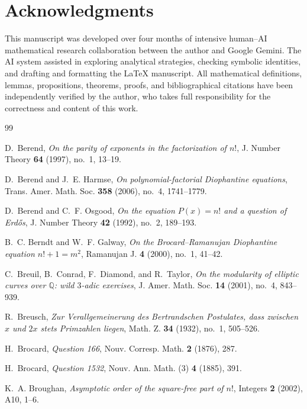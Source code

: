 \documentclass[11pt,reqno]{amsart}
\theoremstyle{remark}
\numberwithin{equation}{section}
\newcommand{\Q}{\mathbb{Q}}
\begin{document}
\section*{Acknowledgments}
This manuscript was developed over four months of intensive human--AI mathematical research collaboration between the author and Google Gemini. The AI system assisted in exploring analytical strategies, checking symbolic identities, and drafting and formatting the \LaTeX{} manuscript. All mathematical definitions, lemmas, propositions, theorems, proofs, and bibliographical citations have been independently verified by the author, who takes full responsibility for the correctness and content of this work.

\begin{thebibliography}{99}

D.~Berend, \emph{On the parity of exponents in the factorization of $n!$}, J. Number Theory \textbf{64} (1997), no.~1, 13--19.

D.~Berend and J.~E. Harmse, \emph{On polynomial-factorial Diophantine equations}, Trans. Amer. Math. Soc. \textbf{358} (2006), no.~4, 1741--1779.

D.~Berend and C.~F. Osgood, \emph{On the equation $P(x) = n!$ and a question of Erd\H{o}s}, J. Number Theory \textbf{42} (1992), no.~2, 189--193.

B.~C. Berndt and W.~F. Galway, \emph{On the Brocard--Ramanujan Diophantine equation $n! + 1 = m^2$}, Ramanujan J. \textbf{4} (2000), no.~1, 41--42.

C.~Breuil, B.~Conrad, F.~Diamond, and R.~Taylor, \emph{On the modularity of elliptic curves over $\Q$: wild $3$-adic exercises}, J. Amer. Math. Soc. \textbf{14} (2001), no.~4, 843--939.

R.~Breusch, \emph{Zur Verallgemeinerung des Bertrandschen Postulates, dass zwischen $x$ und $2x$ stets Primzahlen liegen}, Math. Z. \textbf{34} (1932), no.~1, 505--526.

H.~Brocard, \emph{Question 166}, Nouv. Corresp. Math. \textbf{2} (1876), 287.

H.~Brocard, \emph{Question 1532}, Nouv. Ann. Math. (3) \textbf{4} (1885), 391.

K.~A. Broughan, \emph{Asymptotic order of the square-free part of $n!$}, Integers \textbf{2} (2002), A10, 1--6.


\end{thebibliography}
\end{document}
